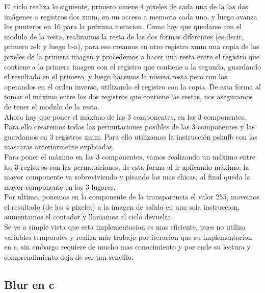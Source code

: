 El ciclo realiza lo siguiente, primero mueve 4 pixeles de cada una de la las dos imágenes a registros dos xmm, en un acceso a memoria cada uno, y luego avanza los punteros en 16 para la próxima iteracion. Como hay que quedarse con el modulo de la resta, realizamos la resta de las dos formas diferentes (es decir, primero a-b y luego b-a), para eso creamos en otro registro xmm una copia de los pixeles de la primera imagen y procedemos a hacer una resta entre el registro que contiene a la primera imagen con el registro que contiene a la segunda, guardando el resultado en el primero, y luego hacemos la misma resta pero con los operandos en el orden inverso, utilizando el registro con la copia. De esta forma al tomar el máximo entre los dos registros que contiene las restas, nos aseguramos de tener el modulo de la resta. \\

Ahora hay que poner el máximo de las 3 componentes, en las 3 componentes. Para ello crearemos todas las permutaciones posibles de las 3 componentes y las guardamos en 3 registros xmm. Para ello utilizamos la instrucción pshufb con las mascaras anteriormente explicadas. \\

Para poner el máximo en las 3 componentes, vamos realizando un máximo entre los 3 registros con las permutaciones, de esta forma al ir aplicando máximo, la mayor componente va sobreviviendo y pisando las mas chicas, al final queda la mayor componente en los 3 lugares. \\

Por ultimo, ponemos en la componente de la transparencia el valor 255, movemos el resultado (de los 4 pixeles) a la imagen de salida en una sola instruccion, aumentamos el contador y llamamos al ciclo devuelta. \\

Se ve a simple vista que esta implementacion es mas eficiente, pues no utiliza variables temporales y realiza más trabajo por iteracion que su implementacion en c, sin embargo requiere de mucho mas conocimiento y por ende su lectura y comprendimiento deja de ser tan sencillo. 

\subsection{Blur en c}

